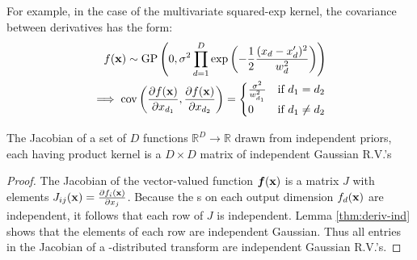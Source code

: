 For example, in the case of the multivariate squared-exp kernel, the covariance between derivatives has the form:
%
\begin{align}
f({\bf{x}}) \sim \textnormal{GP}\left( 0, 
\sigma^2 \prod_{d=1}^D \exp \left(-\frac{1}{2} \frac{(x_d - x_d')^2}{w_d^2} \right) \right) \nonumber \\
 \implies 
\operatorname{cov} \left( \frac{\partial f({\bf{x}})}{\partial x_{d_1}}, \frac{\partial f({\bf{x}})}{\partial x_{d_2}} \right) =
\begin{cases} 
\frac{\sigma^2}{w_{d_1}^2} & \mbox{if } d_1 = d_2 \\ 
0 & \mbox{if } d_1 \neq d_2 \end{cases}
\end{align}


\begin{lemma}
\label{thm:matrix}
The Jacobian of a set of $D$ functions $\mathbb{R}^D \rightarrow \mathbb{R}$ drawn from independent \gp{} priors, each having product kernel is a $D \times D$ matrix of independent Gaussian R.V.'s
\end{lemma}
%
\begin{proof}
The Jacobian of the vector-valued function $\boldsymbol{f}({\bf{x}})$ is a matrix $J$ with elements ${J_{ij}({\bf{x}}) = \frac{ \partial f_i ({\bf{x}}) }{\partial x_j}}$.
%
%
%
Because the \gp{}s on each output dimension $f_d({\bf{x}})$ are independent, it follows that each row of $J$ is independent.
Lemma \ref{thm:deriv-ind} shows that the elements of each row are independent Gaussian.
Thus all entries in the Jacobian of a \gp{}-distributed transform are independent Gaussian R.V.'s.
\end{proof}



